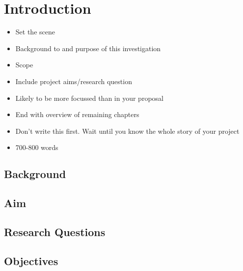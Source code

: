\section{Introduction}

\begin{itemize}
    \item Set the scene 
    \item Background to and purpose of this investigation
    \item Scope
    \item Include project aims/research question
    \item Likely to be more focussed than in your proposal
    \item End with overview of remaining chapters
    \item Don't write this first. Wait until you know the whole story of your project
    \item 700-800 words
\end{itemize}

\subsection{Background}



\subsection{Aim}



\subsection{Research Questions}



\subsection{Objectives}